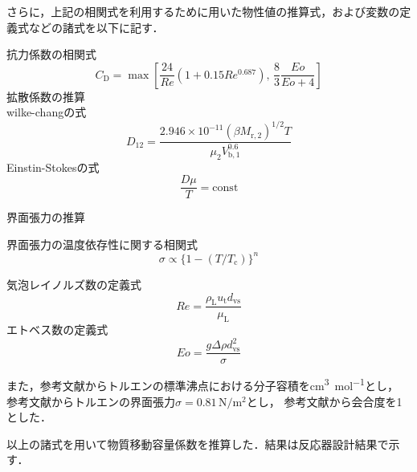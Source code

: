\documentclass[a4j]{jsreport}
\begin{document}
さらに，上記の相関式を利用するために用いた物性値の推算式，および変数の定義式などの諸式を以下に記す．

\noindent 抗力係数の相関式\cite{19952357}
\begin{equation}
    C_\mathrm{D} = \max \left[ \frac{24}{Re}(1+0.15Re^{0.687}), \, \frac{8}{3} \frac{Eo}{Eo+4} \right]
\end{equation}
拡散係数の推算\\
wilke-changの式\cite{化工便覧}
\begin{equation}
    D_{12} = \frac{2.946\times 10^{-11}(\beta M_{\mathrm{r,2}})^{1/2} T} {\mu_2 V_{\mathrm{b},1}^{0.6}}
\end{equation}
Einstin-Stokesの式\cite{実験テキスト}
\begin{equation}
    \frac{D \mu}{T} = \text{const}
\end{equation}

\noindent 界面張力の推算

\noindent 界面張力の温度依存性に関する相関式\cite{化工便覧}
\begin{equation}
    \sigma \propto \{ 1-(T/T_\mathrm{c}) \}^n
\end{equation}

\noindent 気泡レイノルズ数の定義式\cite{19952357}
\begin{equation}
    Re = \frac{\rho_\mathrm{L}u_\mathrm{t} d_\mathrm{vs}}{\mu_\mathrm{L}}
\end{equation}
\noindent エトベス数の定義式\cite{19952357}
\begin{equation}
    Eo = \frac{g \varDelta \rho d_\mathrm{vs}^2}{\sigma}
\end{equation}

また，参考文献\cite{化工便覧}からトルエンの標準沸点における分子容積を\si{\cubic \centi \metre \per \mole}とし，
参考文献\cite{界面張力}からトルエンの界面張力$\sigma=0.81 \,\si{\newton \per \metre \squared}$とし，
参考文献\cite{TPP}から会合度を1とした．

以上の諸式を用いて物質移動容量係数を推算した．結果は反応器設計結果で示す．
\end{document}
